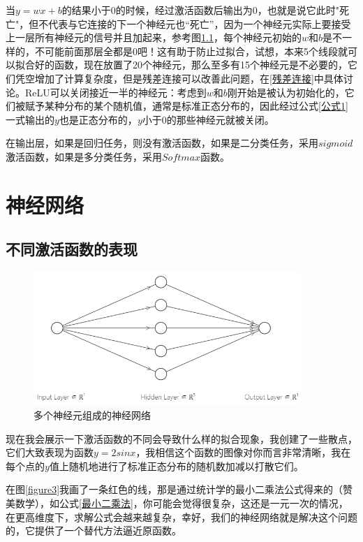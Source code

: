 \documentclass[a5paper, 11pt, openany]{book}
\begin{document}
当$y=wx+b$的结果小于0的时候，经过激活函数后输出为0，也就是说它此时"死亡"，但不代表与它连接的下一个神经元也“死亡”，因为一个神经元实际上要接受上一层所有神经元的信号并且加起来，参考图\ref{figure2}，每个神经元初始的$w$和$b$是不一样的，不可能前面那层全都是0吧！这有助于防止过拟合，试想，本来5个线段就可以拟合好的函数，现在放置了20个神经元，那么至多有15个神经元是不必要的，它们凭空增加了计算复杂度，但是残差连接可以改善此问题，在\ref{残差连接}中具体讨论。ReLU可以关闭接近一半的神经元：考虑到$w$和$b$刚开始是被认为初始化的，它们被赋予某种分布的某个随机值，通常是标准正态分布的，因此经过公式\ref{公式1}一式输出的$y$也是正态分布的，$y$小于0的那些神经元就被关闭。

在输出层，如果是回归任务，则没有激活函数，如果是二分类任务，采用$sigmoid$激活函数，如果是多分类任务，采用$Softmax$函数。


\chapter{神经网络} \label{神经网络章节}

\section{不同激活函数的表现}

\begin{figure}[ht]
    \centering
    \includegraphics[width=0.9\textwidth]{figures/神经网络.png}
    \caption{多个神经元组成的神经网络}
    \label{figure2}
\end{figure}

现在我会展示一下激活函数的不同会导致什么样的拟合现象，我创建了一些散点，它们大致表现为函数$y=2sinx$，我相信这个函数的图像对你而言非常清晰，我在每个点的$y$值上随机地进行了标准正态分布的随机数加减以打散它们。

在图\ref{figure3}我画了一条红色的线，那是通过统计学的最小二乘法公式得来的（赞美数学），如公式\ref{最小二乘法}，你可能会觉得很复杂，这还是一元一次的情况，在更高维度下，求解公式会越来越复杂，幸好，我们的神经网络就是解决这个问题的，它提供了一个替代方法逼近原函数。
\end{document}
